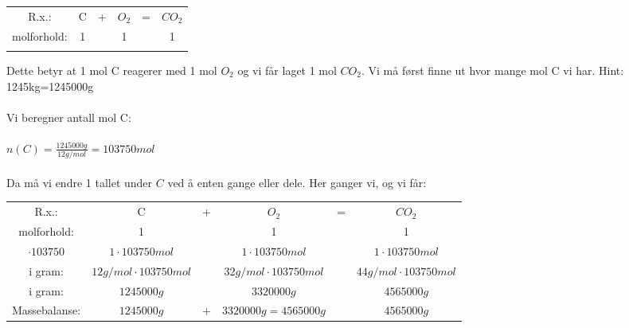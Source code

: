 \documentclass[12pt,a4paper]{article}
\begin{document}
\begin{table}[h!]
    \centering
    \begin{tabular}{cccccc}
         R.x.:&  C&  +&  $O_2$&  =& $CO_2$\\
         molforhold:&1  &  & 1 &  &1 \\
         &  &  &  &  & \\
    \end{tabular}
\end{table}
Dette betyr at 1 mol C reagerer med 1 mol $O_2$ og vi får laget 1 mol $CO_2$. Vi må først finne ut hvor mange mol C vi har.  Hint: 1245kg=1245000g\\\\
Vi beregner antall mol C:\\\\
$n(C)=\frac{1245000g}{12g/mol}=103750mol$\\\\
Da må vi endre 1 tallet under $C$ ved å enten gange eller dele.  Her ganger vi, og vi får:
\begin{table}[h!]
    \centering
    \begin{tabular}{cccccc}
         R.x.:&  C&  +&  $O_2$&  =& $CO_2$\\
         molforhold:&1  &  & 1 &  &1 \\
         $\cdot 103750$&$1\cdot 103750mol$& &  $1\cdot 103750mol$&  &$1\cdot 103750mol$\\
         i gram:&$12g/mol\cdot 103750mol$& &  $32g/mol\cdot 103750mol$&  &$44g/mol\cdot 103750mol$\\
         i gram:&$1245000g$& &  $3320000g$&  &$4565000g$\\
         Massebalanse:&$1245000g$& +&  $3320000g=4565000g$&  &$4565000g$\\
    \end{tabular}
\end{table}\newpage
 
\end{document}
